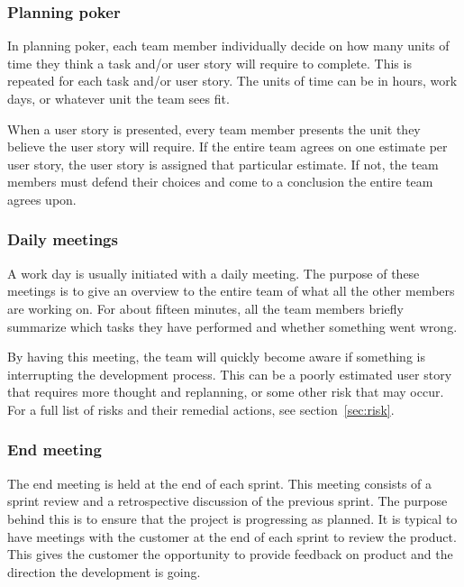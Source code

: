 \subsubsection{Planning poker}
In planning poker, each team member individually decide on how many units of time they think a task and/or user story will require to complete. This is repeated for each task and/or user story. The units of time can be in hours, work days, or whatever unit the team sees fit.

When a user story is presented, every team member presents the unit they believe the user story will require. If the entire team agrees on one estimate per user story, the user story is assigned that particular estimate. If not, the team members must defend their choices and come to a conclusion the entire team agrees upon.

\subsubsection{Daily meetings}
A work day is usually initiated with a daily meeting. The purpose of these meetings is to give an overview to the entire team of what all the other members are working on. For about fifteen minutes, all the team members briefly summarize which tasks they have performed and whether something went wrong.

By having this meeting, the team will quickly become aware if something is interrupting the development process. This can be a poorly estimated user story that requires more thought and replanning, or some other risk that may occur. For a full list of risks and their remedial actions, see section~\ref{sec:risk}. 

\subsubsection{End meeting}
The end meeting is held at the end of each sprint. This meeting consists of a sprint review and a retrospective discussion of the previous sprint. The purpose behind this is to ensure that the project is progressing as planned. It is typical to have meetings with the customer at the end of each sprint to review the product. This gives the customer the opportunity to provide feedback on product and the direction the development is going.

